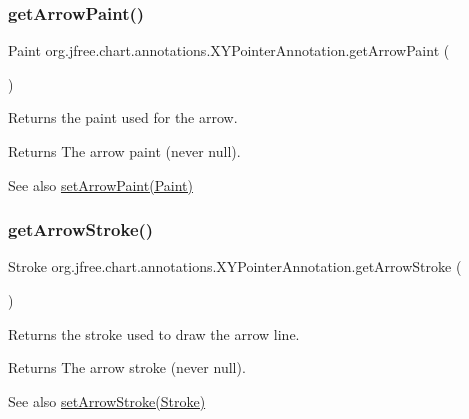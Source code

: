 \subsubsection{\texorpdfstring{get\+Arrow\+Paint()}{getArrowPaint()}}
{\footnotesize\ttfamily Paint org.\+jfree.\+chart.\+annotations.\+X\+Y\+Pointer\+Annotation.\+get\+Arrow\+Paint (\begin{DoxyParamCaption}{ }\end{DoxyParamCaption})}

Returns the paint used for the arrow.

\begin{DoxyReturn}{Returns}
The arrow paint (never {\ttfamily null}).
\end{DoxyReturn}
\begin{DoxySeeAlso}{See also}
\mbox{\hyperlink{classorg_1_1jfree_1_1chart_1_1annotations_1_1_x_y_pointer_annotation_a7d50d7097cce8e312281b10f20fcf561}{set\+Arrow\+Paint(\+Paint)}} 
\end{DoxySeeAlso}
\mbox{\label{classorg_1_1jfree_1_1chart_1_1annotations_1_1_x_y_pointer_annotation_a1862ff709839409de0275283c50830fa}} 
\subsubsection{\texorpdfstring{get\+Arrow\+Stroke()}{getArrowStroke()}}
{\footnotesize\ttfamily Stroke org.\+jfree.\+chart.\+annotations.\+X\+Y\+Pointer\+Annotation.\+get\+Arrow\+Stroke (\begin{DoxyParamCaption}{ }\end{DoxyParamCaption})}

Returns the stroke used to draw the arrow line.

\begin{DoxyReturn}{Returns}
The arrow stroke (never {\ttfamily null}).
\end{DoxyReturn}
\begin{DoxySeeAlso}{See also}
\mbox{\hyperlink{classorg_1_1jfree_1_1chart_1_1annotations_1_1_x_y_pointer_annotation_a88f681ba5b883b0888bda7c6b229d603}{set\+Arrow\+Stroke(\+Stroke)}} 
\end{DoxySeeAlso}
\mbox{\label{classorg_1_1jfree_1_1chart_1_1annotations_1_1_x_y_pointer_annotation_a77602bfbf1eaac644b2832138d33cfd8}} 
